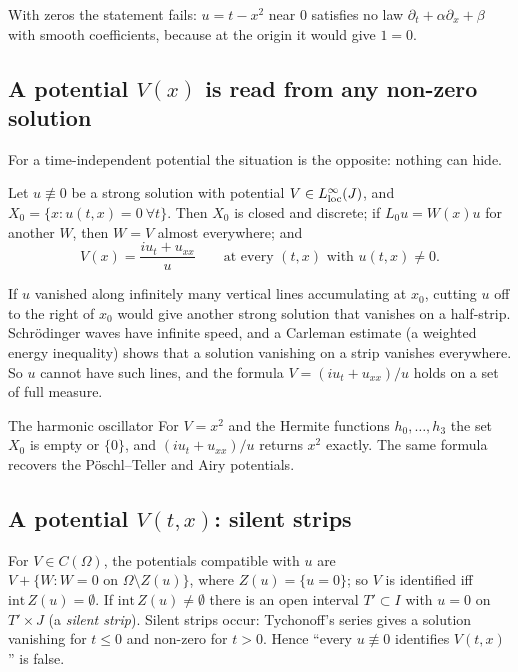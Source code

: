 \begin{caution}[title=Zeros matter]
With zeros the statement fails: $u=t-x^2$ near $0$ satisfies no law $\partial_t+\alpha\partial_x+\beta$ with smooth coefficients, because at the origin it would give $1=0$.
\end{caution}

\subsection{A potential $V(x)$ is read from any non-zero solution}

For a time-independent potential the situation is the opposite: nothing can hide.

\begin{theorem}\label{thm:vart1b}
Let $u\not\equiv0$ be a strong solution with potential $V\in L^\infty_{\rm loc}(J)$, and $X_0=\{x:u(t,x)=0\ \forall t\}$. Then $X_0$ is closed and discrete; if $L_0u=W(x)u$ for another $W$, then $W=V$ almost everywhere; and
\[
V(x)=\frac{iu_t+u_{xx}}{u}\qquad\text{at every }(t,x)\text{ with }u(t,x)\ne0 .
\]
\end{theorem}

\begin{intuition}
If $u$ vanished along infinitely many vertical lines accumulating at $x_0$, cutting $u$ off to the right of $x_0$ would give another strong solution that vanishes on a half-strip. Schr\"odinger waves have infinite speed, and a Carleman estimate (a weighted energy inequality) shows that a solution vanishing on a strip vanishes everywhere. So $u$ cannot have such lines, and the formula $V=(iu_t+u_{xx})/u$ holds on a set of full measure.
\end{intuition}

\begin{example}{The harmonic oscillator}
For $V=x^2$ and the Hermite functions $h_0,\dots,h_3$ the set $X_0$ is empty or $\{0\}$, and $(iu_t+u_{xx})/u$ returns $x^2$ exactly. The same formula recovers the P\"oschl--Teller and Airy potentials.
\end{example}

\subsection{A potential $V(t,x)$: silent strips}

\begin{theorem}\label{thm:vart1c}
For $V\in C(\Omega)$, the potentials compatible with $u$ are $V+\{W:W=0\text{ on }\Omega\setminus Z(u)\}$, where $Z(u)=\{u=0\}$; so $V$ is identified iff $\mathrm{int}\,Z(u)=\emptyset$. If $\mathrm{int}\,Z(u)\ne\emptyset$ there is an open interval $T'\subset I$ with $u=0$ on $T'\times J$ (a \emph{silent strip}). Silent strips occur: Tychonoff's series gives a solution vanishing for $t\le0$ and non-zero for $t>0$. Hence ``every $u\not\equiv0$ identifies $V(t,x)$'' is false.
\end{theorem}

